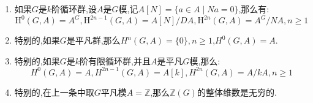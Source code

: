 \begin{enumerate}
\begin{enumerate}[(1)]
\begin{proof}
			首先$G$是有限循环群时$\mathbb{Z}[G]$是交换环,左乘和右乘是相同的映射.按照$\mathbb{Z}[G]$中有$ND=DN=0$,于是这是一个复形.这里$\varepsilon$是满射,于是$\mathbb{Z}$处正合.
			
			任取$\ker\varepsilon$中的元$y=\sum m_ix^i$,那么$\sum m_i=0$,导致$y=(x-1)z$,于是$y\in\mathrm{Im}D$.
			
			任取$\ker D$中的元$y=\sum m_ix^i$,那么$(x-1)y=0$,导致$m_{k-1}=m_0$,$m_0=m_1$,$\cdots$,$m_{k-2}=m_{k-1}$,于是$y\in\mathrm{Im}N$.
			
			任取$\ker N$中的元$y=\sum m_ix^i$,那么$0=\varepsilon Ny=\varepsilon(N)\varepsilon(y)=k\varepsilon(y)$,于是$\varepsilon(y)=0$,导致$y\in\mathrm{Im}D$.
		\end{proof}
		\item 如果$G$是$k$阶循环群,设$A$是$G$模,记$A[N]=\{a\in A\mid Na=0\}$,那么有:
		$$\mathrm{H}^0(G,A)=A^G,\mathrm{H}^{2n-1}(G,A)=A[N]/DA,\mathrm{H}^{2n}(G,A)=A^G/NA,n\ge1$$
		\item 特别的,如果$G$是平凡群,那么$H^n(G,A)=\{0\},n\ge1$,$H^0(G,A)=A$.
		\item 特别的,如果$G$是$k$阶有限循环群,并且$A$是平凡$G$模,那么:
		$$H^0(G,A)=A,H^{2n-1}(G,A)=A[k],H^{2n}(G,A)=A/kA,n\ge1$$
		\item 特别的,在上一条中取$G$平凡模$A=\mathbb{Z}$,那么$\mathbb{Z}(G)$的整体维数是无穷的.
	\end{enumerate}
\end{enumerate}

